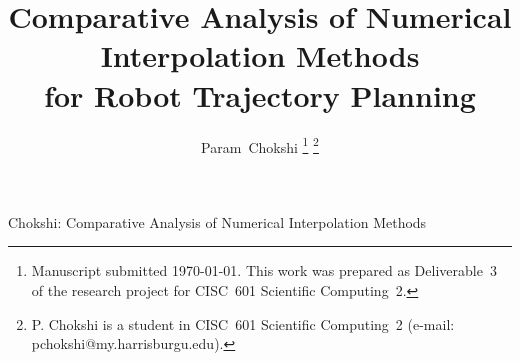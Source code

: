 \documentclass[journal]{IEEEtran}
\begin{document}

\title{Comparative Analysis of Numerical Interpolation Methods\\
       for Robot Trajectory Planning}

\author{Param~Chokshi%
\thanks{Manuscript submitted \today.
This work was prepared as Deliverable~3 of the research project
for CISC~601 Scientific Computing~2.}%
\thanks{P. Chokshi is a student in CISC~601 Scientific Computing~2
(e-mail: pchokshi@my.harrisburgu.edu).}}

%
{Chokshi: Comparative Analysis of Numerical Interpolation Methods}

\maketitle

















\end{document}
